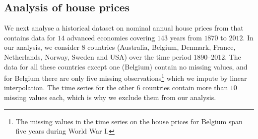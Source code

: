 \documentclass[a4paper,12pt]{article}
\begin{document}


\subsection{Analysis of house prices}\label{subsec:app:hp}


We next analyse a historical dataset on nominal annual house prices from \cite{Knoll2017} that contains data for $14$ advanced economies covering $143$ years from $1870$ to $2012$. 
In our analysis, we consider 8 countries (Australia, Belgium, Denmark, France, Netherlands, Norway, Sweden and USA) over the time period 1890--2012. The data for all these countries except one (Belgium) contain no missing values, and for Belgium there are only five missing observations\footnote{The missing values in the time series on the house prices for Belgium span five years during World War I.} which we impute by linear interpolation. The time series for the other $6$ countries contain more than $10$ missing values each, which is why we exclude them from our analysis.
\end{document}
